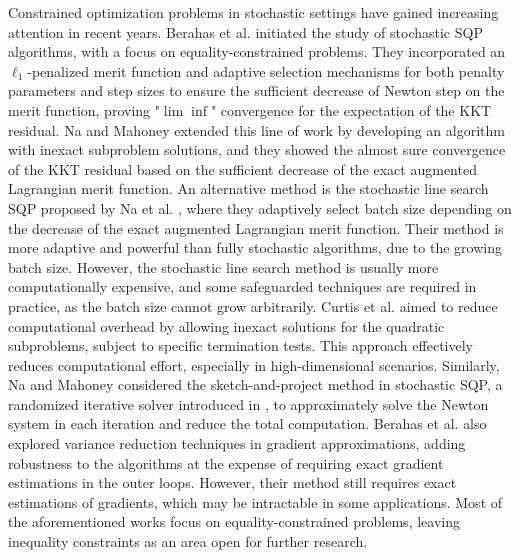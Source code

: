 \documentclass[aos]{imsart}
\numberwithin{equation}{section}
\theoremstyle{plain}
\begin{document}
Constrained optimization problems in stochastic settings have gained increasing attention in recent years.  
Berahas et al. \cite{berahas2021sequential} initiated the study of stochastic SQP algorithms, with a focus on equality-constrained problems.
They incorporated an $\ell_1$-penalized merit function and adaptive selection mechanisms for both penalty parameters and step sizes to ensure the sufficient decrease of Newton step on the merit function, proving "$\lim \inf$" convergence for the expectation of the KKT residual.
Na and Mahoney \cite{na2022asymptotic} extended this line of work by developing an algorithm with inexact subproblem solutions, and they showed the almost sure convergence of the KKT residual based on the sufficient decrease of the exact augmented Lagrangian merit function. 
An alternative method is the stochastic line search SQP proposed by Na et al. \cite{na2023adaptive}, where they adaptively select batch size depending on the decrease of the exact augmented Lagrangian merit function. 
Their method is more adaptive and powerful than fully stochastic algorithms, due to the growing batch size. 
However, the stochastic line search method is usually more computationally expensive, and some safeguarded techniques are required in practice, as the batch size cannot grow arbitrarily. 
Curtis et al. \cite{curtis2021inexact} aimed to reduce computational overhead by allowing inexact solutions for the quadratic subproblems, subject to specific termination tests. This approach effectively reduces computational effort, especially in high-dimensional scenarios.
Similarly, Na and Mahoney \cite{na2022asymptotic} considered the sketch-and-project method in stochastic SQP, a randomized iterative solver introduced in \cite{gower2015randomized}, to approximately solve the Newton system in each iteration and reduce the total computation. 
Berahas et al. \cite{berahas2023accelerating} also explored variance reduction techniques in gradient approximations, adding robustness to the algorithms at the expense of requiring exact gradient estimations in the outer loops.  
However, their method still requires exact estimations of gradients, which may be intractable in some applications. 
Most of the aforementioned works focus on equality-constrained problems, leaving inequality constraints as an area open for further research.
\end{document}
